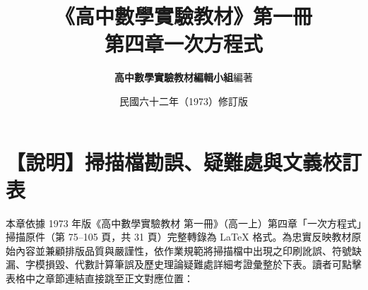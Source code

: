 \documentclass[a4paper,12pt,twoside]{article}
\title{\LARGE\textbf{《高中數學實驗教材》第一冊}\\[0.5em] \Large\textbf{第四章\quad 一次方程式}}
\author{\textbf{高中數學實驗教材編輯小組}\quad 編著}
\date{民國六十二年（1973）修訂版}
\begin{document}
\maketitle
\thispagestyle{firstpage}

\section*{【說明】掃描檔勘誤、疑難處與文義校訂表}
\label{sec:master_errata_notes}

本章依據 1973 年版《高中數學實驗教材 第一冊》（高一上）第四章「一次方程式」掃描原件（第 75--105 頁，共 31 頁）完整轉錄為 \LaTeX{} 格式。為忠實反映教材原始內容並兼顧排版品質與嚴謹性，依作業規範將掃描檔中出現之印刷訛誤、符號缺漏、字模損毀、代數計算筆誤及歷史理論疑難處詳細考證彙整於下表。讀者可點擊表格中之章節連結直接跳至正文對應位置：
\end{document}
